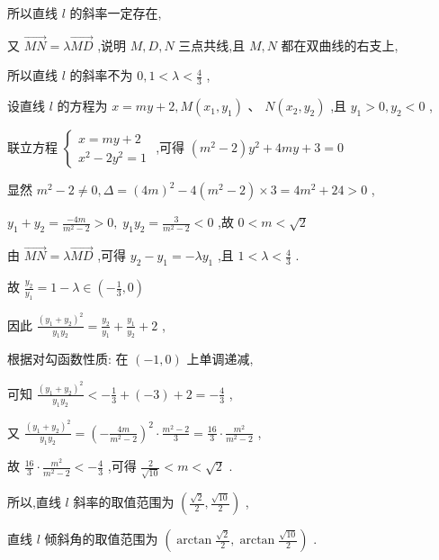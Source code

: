 \documentclass[10pt]{article}
\begin{document}
所以直线 \(l\) 的斜率一定存在,

又 \(\overrightarrow{MN} = \lambda \overrightarrow{MD}\) ,说明 \(M, D, N\) 三点共线,且 \(M, N\) 都在双曲线的右支上,

所以直线 \(l\) 的斜率不为 \(0,1 < \lambda  < \frac{4}{3}\) ,

设直线 \(l\) 的方程为 \(x = {my} + 2, M\left( {{x}_{1},{y}_{1}}\right) \text{ 、 }N\left( {{x}_{2},{y}_{2}}\right)\) ,且 \({y}_{1} > 0,{y}_{2} < 0\) ,

联立方程 \(\left\{  \begin{array}{l} x = {my} + 2 \\  {x}^{2} - 2{y}^{2} = 1 \end{array}\right.\) ,可得 \(\left( {{m}^{2} - 2}\right) {y}^{2} + {4my} + 3 = 0\)

显然 \({m}^{2} - 2 \neq  0,\Delta  = {\left( 4m\right) }^{2} - 4\left( {{m}^{2} - 2}\right)  \times  3 = 4{m}^{2} + {24} > 0\) ,

\({y}_{1} + {y}_{2} = \frac{-{4m}}{{m}^{2} - 2} > 0,\;{y}_{1}{y}_{2} = \frac{3}{{m}^{2} - 2} < 0\) ,故 \(0 < m < \sqrt{2}\)

由 \(\overrightarrow{MN} = \lambda \overrightarrow{MD}\) ,可得 \({y}_{2} - {y}_{1} =  - \lambda {y}_{1}\) ,且 \(1 < \lambda  < \frac{4}{3}\) .

故 \(\frac{{y}_{2}}{{y}_{1}} = 1 - \lambda  \in  \left( {-\frac{1}{3},0}\right)\)

因此 \(\frac{{\left( {y}_{1} + {y}_{2}\right) }^{2}}{{y}_{1}{y}_{2}} = \frac{{y}_{2}}{{y}_{1}} + \frac{{y}_{1}}{{y}_{2}} + 2\) ,

根据对勾函数性质: 在 \(\left( {-1,0}\right)\) 上单调递减,

可知 \(\frac{{\left( {y}_{1} + {y}_{2}\right) }^{2}}{{y}_{1}{y}_{2}} <  - \frac{1}{3} + \left( {-3}\right)  + 2 =  - \frac{4}{3}\) ,

又 \(\frac{{\left( {y}_{1} + {y}_{2}\right) }^{2}}{{y}_{1}{y}_{2}} = {\left( -\frac{4m}{{m}^{2} - 2}\right) }^{2} \cdot  \frac{{m}^{2} - 2}{3} = \frac{16}{3} \cdot  \frac{{m}^{2}}{{m}^{2} - 2}\) ,

故 \(\frac{16}{3} \cdot  \frac{{m}^{2}}{{m}^{2} - 2} <  - \frac{4}{3}\) ,可得 \(\frac{2}{\sqrt{10}} < m < \sqrt{2}\) .

所以,直线 \(l\) 斜率的取值范围为 \(\left( {\frac{\sqrt{2}}{2},\frac{\sqrt{10}}{2}}\right)\) ,

直线 \(l\) 倾斜角的取值范围为 \(\left( {\arctan \frac{\sqrt{2}}{2},\arctan \frac{\sqrt{10}}{2}}\right)\) .
\end{document}
